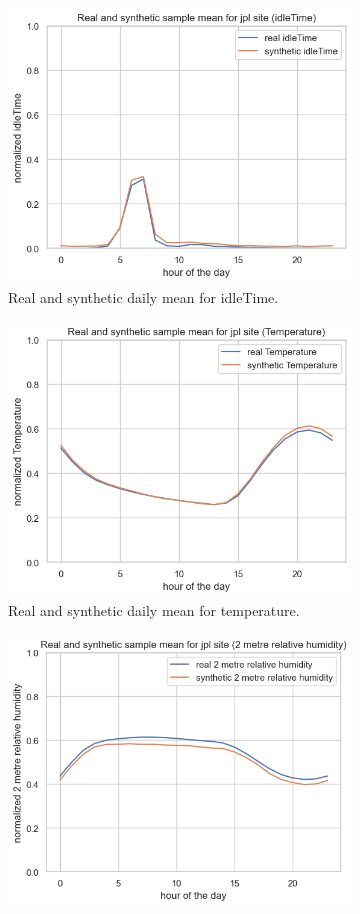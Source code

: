 \begin{figure}
\begin{subfigure}{.45\textwidth}
  \centering
  \includegraphics[width=.8\linewidth]{images/jpl_day_mean_it.png}
  \caption{Real and synthetic daily mean for idleTime.}
  \label{fig:kwh}
\end{subfigure}
\hfill
\begin{subfigure}{.45\textwidth}
  \centering
  \includegraphics[width=.8\linewidth]{images/jpl_day_mean_temp.png}
  \caption{Real and synthetic daily mean for temperature.}
  \label{fig:ct}
\end{subfigure}
\begin{subfigure}{.45\textwidth}
  \centering
  \includegraphics[width=.8\linewidth]{images/jpl_day_mean_rhum.png}

\end{subfigure}
\end{figure}
